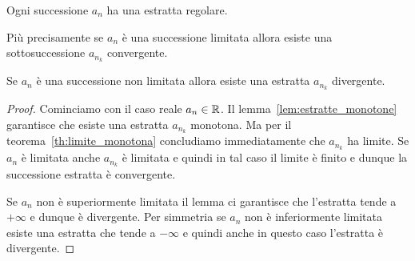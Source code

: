 \begin{theorem}\label{th:Bolzano}
\label{th:bolzano_weierstrass}%
\mymark{***}%
%
%
Ogni successione $a_n$ ha una estratta regolare.

Più precisamente se $a_n$ è una successione limitata
allora esiste una sottosuccessione
$a_{n_k}$ convergente.

Se $a_n$ è una successione non limitata allora 
esiste una estratta $a_{n_k}$ divergente.
\end{theorem}
%
\begin{proof}
\mymark{***}
Cominciamo con il caso reale $a_n\in \mathbb R$.
Il lemma~\ref{lem:estratte_monotone} garantisce 
che esiste una estratta $a_{n_k}$ monotona. 
Ma per il teorema~\ref{th:limite_monotona} concludiamo 
immediatamente che $a_{n_k}$ ha limite.
Se $a_n$ è limitata anche $a_{n_k}$ è limitata e quindi 
in tal caso il limite è finito e dunque la successione 
estratta è convergente.

Se $a_n$ non è superiormente limitata il lemma 
ci garantisce che l'estratta tende a $+\infty$ 
e dunque è divergente.
Per simmetria se $a_n$ non è inferiormente limitata 
esiste una estratta che tende a $-\infty$ e quindi anche in
questo caso l'estratta è divergente.

\begin{comment} %
Facciamo dapprima il caso $a_n\in \RR$.
\mymark{***}
Sia $A_0=\inf a_n$ e $B_0=\sup a_n$. Essendo $a_n$ limitata
sia $A_0$
che $B_0$ sono finiti e ogni termine della successione sta
nell'intervallo $[A_0,B_0]$. Definiamo $n_0=0$: ovviamente si avrà $a_{n_0} = a_0 \in [A_0, B_0]$.

Consideriamo il punto medio $M_0 = (A_0+B_0)/2$ dell'intervallo $[A_0,B_0]$ e consideriamo i due mezzi intervalli $[A_0,M_0]$ e $[M_0,B_0]$. Tutti i termini della successione stanno in almeno
uno di questi due intervalli.
Se consideriamo gli indici $n\in \NN$ della successione $a_n$, uno dei due sotto-intervalli deve contenere termini
della successione per infiniti indici.
Chiamiamo $[A_1, B_1]$
tale sottointervallo,
chiamiamo $n_1$ il più piccolo naturale maggiore di $n_0=0$
per cui $a_{n_1} \in [A_1,  B_1]$.

Ripetiamo il procedimento.
Consideriamo il punto medio $M_1$ dell'intervallo $[A_1,B_1]$.
Per costruzione l'intervallo contiene termini della successione
per infiniti indici dunque uno dei due sotto-intervalli $[A_1,M_1]$
o $[M_1,B_1]$ deve anche lui
contenere termini della successione per infiniti indici. Chiamiamo
$[A_2, B_2]$ tale intervallo e definiamo $n_2$ come il più piccolo
naturale maggiore di $n_1$ per cui $a_{n_2}\in [A_2, B_2]$.


\end{comment}
\end{proof}
